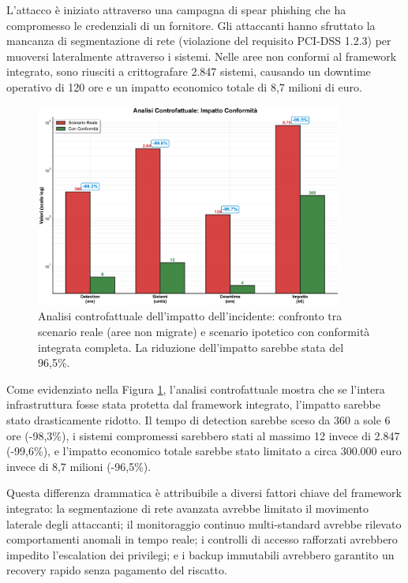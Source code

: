 L'attacco è iniziato attraverso una campagna di spear phishing che ha compromesso le credenziali di un fornitore. Gli attaccanti hanno sfruttato la mancanza di segmentazione di rete (violazione del requisito PCI-DSS 1.2.3) per muoversi lateralmente attraverso i sistemi. Nelle aree non conformi al framework integrato, sono riusciti a crittografare 2.847 sistemi, causando un downtime operativo di 120 ore e un impatto economico totale di 8,7 milioni di euro.

\begin{figure}[h]
\centering
\includegraphics[width=0.9\textwidth]{thesis_figures/cap4/figura_4_5_confronto_LARGE.pdf}
\caption{Analisi controfattuale dell'impatto dell'incidente: confronto tra scenario reale (aree non migrate) e scenario ipotetico con conformità integrata completa. La riduzione dell'impatto sarebbe stata del 96,5\%.}
\label{fig:controfattuale}
\end{figure}

Come evidenziato nella Figura \ref{fig:controfattuale}, l'analisi controfattuale mostra che se l'intera infrastruttura fosse stata protetta dal framework integrato, l'impatto sarebbe stato drasticamente ridotto. Il tempo di detection sarebbe sceso da 360 a sole 6 ore (-98,3\%), i sistemi compromessi sarebbero stati al massimo 12 invece di 2.847 (-99,6\%), e l'impatto economico totale sarebbe stato limitato a circa 300.000 euro invece di 8,7 milioni (-96,5\%).

Questa differenza drammatica è attribuibile a diversi fattori chiave del framework integrato: la segmentazione di rete avanzata avrebbe limitato il movimento laterale degli attaccanti; il monitoraggio continuo multi-standard avrebbe rilevato comportamenti anomali in tempo reale; i controlli di accesso rafforzati avrebbero impedito l'escalation dei privilegi; e i backup immutabili avrebbero garantito un recovery rapido senza pagamento del riscatto.

